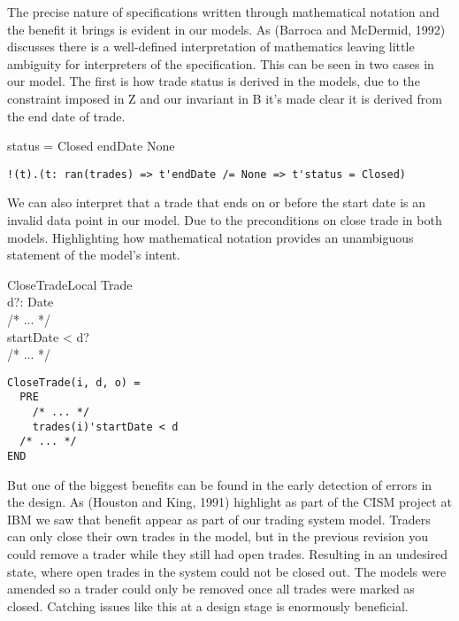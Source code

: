 \documentclass{article}
\begin{document}
The precise nature of specifications written through mathematical notation and the benefit it brings is evident in our models. As (Barroca and McDermid, 1992) discusses there is a well-defined interpretation of mathematics leaving little ambiguity for interpreters of the specification. This can be seen in two cases in our model. The first is how trade status is derived in the models, due to the constraint imposed in Z and our invariant in B it's made clear it is derived from the end date of trade. 
\begin{zed}
status = Closed \implies endDate \neq None \\
\end{zed}

\begin{verbatim}
!(t).(t: ran(trades) => t'endDate /= None => t'status = Closed)
\end{verbatim}
  
\hspace{-0.68cm} We can also interpret that a trade that ends on or before the start date is an invalid data point in our model. Due to the preconditions on close trade in both models. Highlighting how mathematical notation provides an unambiguous statement of the model's intent.

\begin{schema}{CloseTradeLocal}
\Delta Trade \\
d?: Date \\ 
/* ... */ \\
\where  
startDate < d? \\
/* ... */ \\
\end{schema}

\begin{verbatim}
CloseTrade(i, d, o) =
  PRE
    /* ... */
    trades(i)'startDate < d
  /* ... */
END 
\end{verbatim}

\hspace{-0.68cm} But one of the biggest benefits can be found in the early detection of errors in the design. As (Houston and King, 1991) highlight as part of the CISM project at IBM we saw that benefit appear as part of our trading system model. Traders can only close their own trades in the model, but in the previous revision you could remove a trader while they still had open trades. Resulting in an undesired state, where open trades in the system could not be closed out. The models were amended so a trader could only be removed once all trades were marked as closed. Catching issues like this at a design stage is enormously beneficial. 
\end{document}
